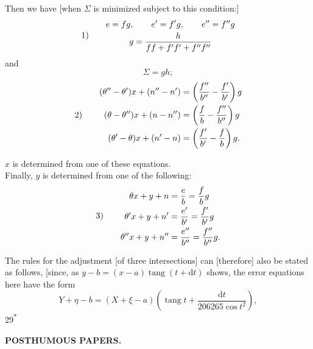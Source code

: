 Then we have [when \(\Sigma\) is minimized subject to this condition:]
\[
\begin{array}{@{}l@{\qquad}c@{}}
 1)&\begin{gathered}
 e=fg,\qquad e'=f'g,\qquad e''=f''g\\
 g=\frac{h}{ff+f'f'+f''f''}
 \end{gathered}
\end{array}
\]
\noindent and
\[
 \Sigma=gh;
\]
\[
\begin{array}{@{}l@{\qquad}c@{}}
 2)&\begin{aligned}
 (\theta''-\theta')x+(n''-n')&=\left(\frac{f''}{b''}-\frac{f'}{b'}\right)g\\
 (\theta-\theta'')x+(n-n'')&=\left(\frac{f}{b}-\frac{f''}{b''}\right)g\\
 (\theta'-\theta)x+(n'-n)&=\left(\frac{f'}{b'}-\frac{f}{b}\right)g.
 \end{aligned}
\end{array}
\]

\(x\) is determined from one of these equations.\\
\hspace*{\parindent}Finally, \(y\) is determined from one of the following:
\[
\begin{array}{@{}l@{\qquad}c@{}}
 3)&\begin{aligned}
 \theta x+y+n&=\frac{e}{b}=\frac{f}{b}g\\
 \theta'x+y+n'&=\frac{e'}{b'}=\frac{f'}{b'}g\\
 \theta''x+y+n''&=\frac{e''}{b''}=\frac{f''}{b''}g.
 \end{aligned}
\end{array}
\]

\medskip
The rules for the adjustment [of three intersections] can [therefore] also be stated as follows, [since, as \(y-b=(x-a)\operatorname{tang}(t+\mathrm{d}t)\) shows, the error equations here have the form
\[
 Y+\eta-b=(X+\xi-a)\left(\operatorname{tang}t+\frac{\mathrm{d}t}{206265\cos t^2}\right),
\]
\noindent\hfill{\small 29\textsuperscript{*}}\hspace*{.12\linewidth}\par

\par\clearpage
\noindent{}\hfill{\small\textbf{POSTHUMOUS PAPERS.}}\hfill\null\par\medskip

